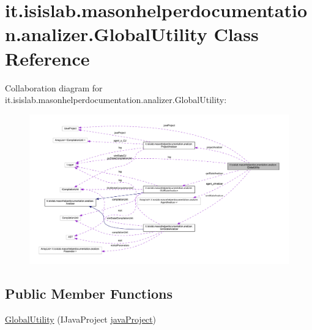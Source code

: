 \hypertarget{classit_1_1isislab_1_1masonhelperdocumentation_1_1analizer_1_1_global_utility}{\section{it.\-isislab.\-masonhelperdocumentation.\-analizer.\-Global\-Utility Class Reference}
\label{classit_1_1isislab_1_1masonhelperdocumentation_1_1analizer_1_1_global_utility}
}


Collaboration diagram for it.\-isislab.\-masonhelperdocumentation.\-analizer.\-Global\-Utility\-:\nopagebreak
\begin{figure}[H]
\begin{center}
\leavevmode
\includegraphics[width=350pt]{classit_1_1isislab_1_1masonhelperdocumentation_1_1analizer_1_1_global_utility__coll__graph}
\end{center}
\end{figure}
\subsection*{Public Member Functions}
\begin{DoxyCompactItemize}
\item 
\hyperlink{classit_1_1isislab_1_1masonhelperdocumentation_1_1analizer_1_1_global_utility_adae135ad8b0683c4320d063c1b4f78eb}{Global\-Utility} (I\-Java\-Project \hyperlink{classit_1_1isislab_1_1masonhelperdocumentation_1_1analizer_1_1_global_utility_a7c812f3b329b2e16cfff9da4b2b1efb3}{java\-Project})
\end{DoxyCompactItemize}
